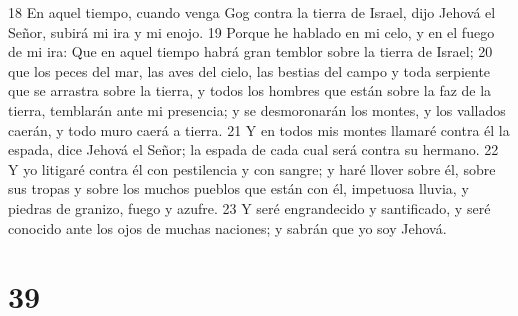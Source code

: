 18 En aquel tiempo, cuando venga Gog contra la tierra de Israel, dijo Jehová el Señor, subirá mi ira y mi enojo.
19 Porque he hablado en mi celo, y en el fuego de mi ira: Que en aquel tiempo habrá gran temblor sobre la tierra de Israel; 
20 que los peces del mar, las aves del cielo, las bestias del campo y toda serpiente que se arrastra sobre la tierra, y todos los hombres que están sobre la faz de la tierra, temblarán ante mi presencia; y se desmoronarán los montes, y los vallados caerán, y todo muro caerá a tierra.
21 Y en todos mis montes llamaré contra él la espada, dice Jehová el Señor; la espada de cada cual será contra su hermano.
22 Y yo litigaré contra él con pestilencia y con sangre; y haré llover sobre él, sobre sus tropas y sobre los muchos pueblos que están con él, impetuosa lluvia, y piedras de granizo, fuego y azufre.
23 Y seré engrandecido y santificado, y seré conocido ante los ojos de muchas naciones; y sabrán que yo soy Jehová.

\chapter{39}

